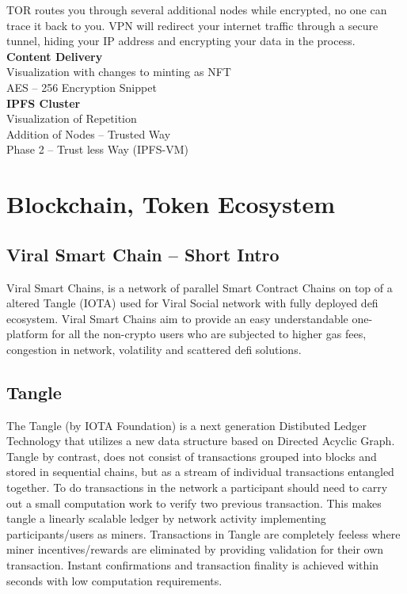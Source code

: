 \documentclass[10pt]{article}
\begin{document}
TOR routes you through several additional nodes while encrypted, no one can trace it back to you. VPN will redirect your internet traffic through a secure tunnel, hiding your IP address and encrypting your data in the process.\\

\textbf{Content Delivery}\\

Visualization with changes to minting as NFT\\

AES – 256 Encryption Snippet\\

\textbf{IPFS Cluster}\\

Visualization of Repetition\\

Addition of Nodes – Trusted Way\\

Phase 2 – Trust less Way (IPFS-VM)\\

\section{Blockchain, Token Ecosystem}

\subsection{Viral Smart Chain – Short Intro}

Viral Smart Chains, is a network of parallel Smart Contract Chains on top of a altered Tangle (IOTA) used for Viral Social network with fully deployed defi ecosystem. Viral Smart Chains aim to provide an easy understandable one-platform for all the non-crypto users who are subjected to higher gas fees, congestion in network, volatility and scattered defi solutions. \\

\subsection{Tangle}

The Tangle (by IOTA Foundation) is a next generation Distibuted Ledger Technology that utilizes a new data structure based on Directed Acyclic Graph. Tangle by contrast, does not consist of transactions grouped into blocks and stored in sequential chains, but as a stream of individual transactions entangled together. To do transactions in the network a participant should need to carry out a small computation work to verify two previous transaction. This makes tangle a linearly scalable ledger by network activity implementing participants/users as miners. Transactions in Tangle are completely feeless where miner incentives/rewards are eliminated by providing validation for their own transaction. Instant confirmations and transaction finality is achieved within seconds with low computation requirements.
\end{document}
